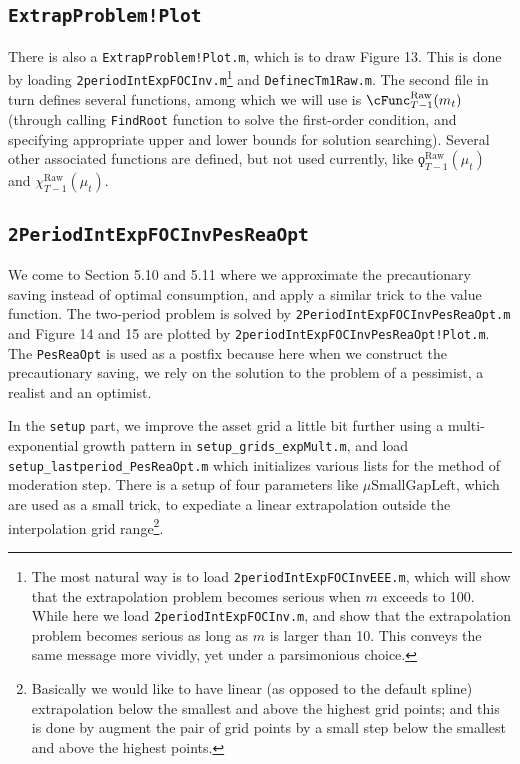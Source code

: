 \documentclass[titlepage,abstract]{\econtex}
\begin{document}
\subsection{\texttt{ExtrapProblem!Plot}}

There is also a \texttt{ExtrapProblem!Plot.m}, which is to draw Figure 13. This is done by loading \texttt{2periodIntExpFOCInv.m}\footnote{The most natural way is to load \texttt{2periodIntExpFOCInvEEE.m}, which will show that the extrapolation problem becomes serious when $m$ exceeds to 100. While here we load \texttt{2periodIntExpFOCInv.m}, and show that the extrapolation problem becomes serious as long as $m$ is larger than 10. This conveys the same message more vividly, yet under a parsimonious choice.} and \texttt{DefinecTm1Raw.m}. The second file in turn defines several functions, among which we will use is $\cFunc_{T-1}^{\text{Raw}} (m_{t})$ (through calling \texttt{FindRoot} function to solve the first-order condition, and specifying appropriate upper and lower bounds for solution searching). Several other associated functions are defined, but not used currently, like $\koppa_{T-1}^{\text{Raw}} (\mu_{t})$ and $\chi_{T-1}^{\text{Raw}} (\mu_{t})$.

\subsection{\texttt{2PeriodIntExpFOCInvPesReaOpt}}
We come to Section 5.10 and 5.11 where we approximate the precautionary saving instead of optimal consumption, and apply a similar trick to the value function. The two-period problem is solved by \texttt{2PeriodIntExpFOCInvPesReaOpt.m} and Figure 14 and 15 are plotted by \texttt{2periodIntExpFOCInvPesReaOpt!Plot.m}. The \texttt{PesReaOpt} is used as a postfix because here when we construct the precautionary saving, we rely on the solution to the problem of a pessimist, a realist and an optimist. 

In the \texttt{setup} part, we improve the asset grid a little bit further using a multi-exponential growth pattern in  \texttt{setup\_grids\_expMult.m}, and load \texttt{setup\_lastperiod\_PesReaOpt.m} which initializes various lists for the method of moderation step. There is a setup of four parameters like $\mu\text{SmallGapLeft}$, which are used as a small trick, to expediate a linear extrapolation outside the interpolation grid range\footnote{Basically we would like to have linear (as opposed to the default spline) extrapolation below the smallest and above the highest grid points; and this is done by augment the pair of grid points by a small step below the smallest and above the highest points.}.
\end{document}
